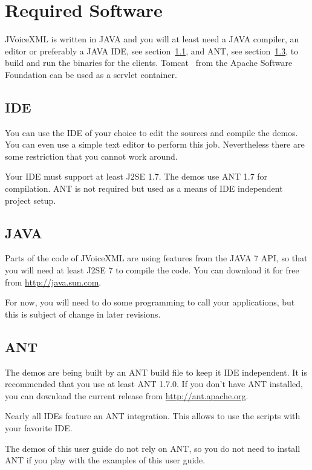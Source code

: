 \documentclass[11pt,a4paper]{book}
\begin{document}
\section{Required Software}
\label{sec:required-software}

JVoiceXML is written in JAVA and you will at least need a JAVA compiler, an 
editor or preferably a JAVA IDE, see section~\ref{sec:ide}, and ANT, see 
section~\ref{sec:ant}, to build and run the binaries for the 
clients. Tomcat~\cite{apache:tomcat} from the Apache Software Foundation can be
used as a servlet container.

\subsection{IDE}
\label{sec:ide}

You can use the IDE of your choice to edit the sources and compile the 
demos. You can even use a simple text editor to perform this job.
Nevertheless there are some restriction that you cannot work around.

Your IDE must support at least J2SE 1.7. The demos use ANT 1.7 for compilation. 
ANT is not required but used as a means of IDE independent project setup.

\subsection{JAVA}
\label{sec:java}

Parts of the code of JVoiceXML are using features from the JAVA 7 API, so that
you will need at least J2SE 7 to compile the code. You can download it
for free from \url{http://java.sun.com}.

For now, you will need to do some programming to call your applications, but
this is subject of change in later revisions.

\subsection{ANT}
\label{sec:ant}

The demos are being built by an ANT build file to keep it IDE independent. It is
recommended that you use at least ANT 1.7.0. 
If you don't have ANT installed, you can download the current release
from \url{http://ant.apache.org}.

Nearly all IDEs feature an ANT integration. This allows to use the scripts with
your favorite IDE.

The demos of this user guide do not rely on ANT, so you do not need to install
ANT if you play with the examples of this user guide.
\end{document}

